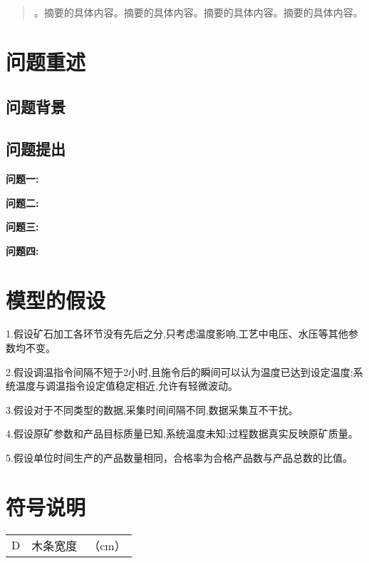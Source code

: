 \documentclass{cumcmthesis}
\title{}
\begin{document}
	\maketitle
	\begin{abstract}
		。摘要的具体内容。摘要的具体内容。摘要的具体内容。摘要的具体内容。
	\end{abstract}
	\section{问题重述}
	\subsection{问题背景}

	\subsection{问题提出}
	\noindent\textbf{问题一:}

	\noindent\textbf{问题二:}
	
	\noindent\textbf{问题三:}

	
	\noindent\textbf{问题四:}

	
	\section{模型的假设}
	
	1.假设矿石加工各环节没有先后之分,只考虑温度影响,工艺中电压、水压等其他参数均不变。
	
	2.假设调温指令间隔不短于2小时,且施令后的瞬间可以认为温度已达到设定温度;系统温度与调温指令设定值稳定相近,允许有轻微波动。
	
	3.假设对于不同类型的数据,采集时间间隔不同,数据采集互不干扰。
	
	4.假设原矿参数和产品目标质量已知,系统温度未知;过程数据真实反映原矿质量。
	
	5.假设单位时间生产的产品数量相同，合格率为合格产品数与产品总数的比值。
	
	\section{符号说明}
	
	\begin{center}
		\begin{tabular}{ccc}
			\hline
			\makebox[0.25\textwidth][c]{符号}	& \makebox[0.35\textwidth][c]{意义} & \makebox[0.3\textwidth][c]{单位}	 \\ \hline
			D	    & 木条宽度 &（cm） \\ \hline
		\end{tabular}
		
	\end{center}
\end{document}
